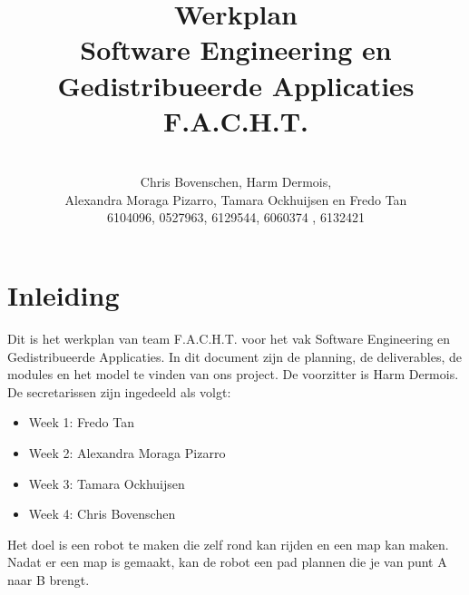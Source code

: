 \documentclass[a4paper,10pt]{article}
\title{Werkplan \\Software Engineering en Gedistribueerde Applicaties F.A.C.H.T.}
\author{\\Chris Bovenschen, Harm Dermois, \\Alexandra Moraga Pizarro, Tamara Ockhuijsen en Fredo Tan \\6104096, 0527963, 6129544, 6060374 , 6132421}
\begin{document}
\maketitle
\tableofcontents
\section{Inleiding}
Dit is het werkplan van team F.A.C.H.T. voor het vak Software Engineering en Gedistribueerde
Applicaties. In dit document zijn de planning, de deliverables, de modules en het model te vinden van ons project. De voorzitter is Harm Dermois. De secretarissen zijn ingedeeld als volgt:
\begin{itemize}
\item Week 1: Fredo Tan
\item Week 2: Alexandra Moraga Pizarro
\item Week 3: Tamara Ockhuijsen
\item Week 4: Chris Bovenschen
\end{itemize}
Het doel is een robot te maken die zelf rond kan rijden en een map kan maken. Nadat er een map is gemaakt, kan de robot een pad plannen die je van punt A naar B brengt.
\end{document}
